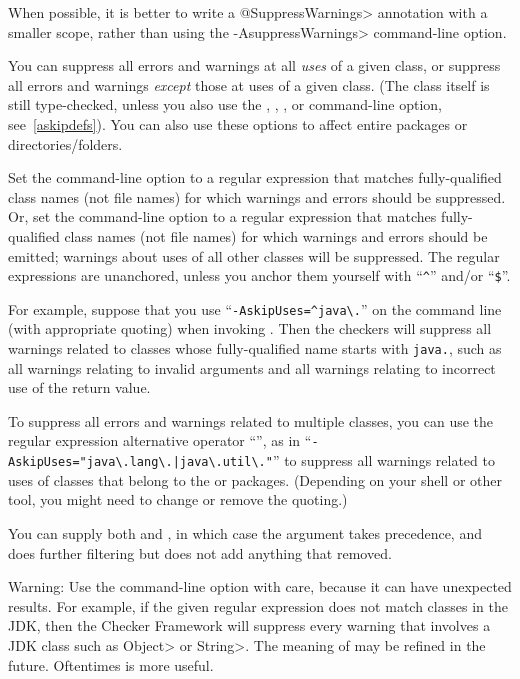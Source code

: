 When possible, it is better to write a \<@SuppressWarnings> annotation with a
smaller scope, rather than using the \<-AsuppressWarnings> command-line option.



You can suppress all errors and warnings at all \emph{uses} of a given
class, or suppress all errors and warnings \emph{except} those at uses of a given
class.  (The class itself is still type-checked, unless you also use
the , , , or 
command-line option, see~\ref{askipdefs}).
You can also use these options to affect entire packages or directories/folders.

Set the  command-line option to a
regular expression that matches fully-qualified class names (not file names) for which warnings and errors
should be suppressed.
Or, set the  command-line option to a
regular expression that matches fully-qualified class names (not file names) for which warnings and errors
should be emitted; warnings about uses of all other classes will be suppressed.
The regular expressions are unanchored, unless you anchor them yourself
with ``\codesize\verb|^|'' and/or ``\codesize\verb|$|''.

For example, suppose that you use
``{\codesize\verb|-AskipUses=^java\.|}'' on the command line
(with appropriate quoting) when invoking
.  Then the checkers will suppress all warnings related to
classes whose fully-qualified name starts with \codesize\verb|java.|, such
as all warnings relating to invalid arguments and all warnings relating to
incorrect use of the return value.

To suppress all errors and warnings related to multiple classes, you can use
the regular expression alternative operator ``\code{|}'', as in
``{\codesize\verb+-AskipUses="java\.lang\.|java\.util\."+}'' to suppress
all warnings related to uses of classes that belong to the  or
 packages.  (Depending on your shell or other tool, you
might need to change or remove the quoting.)

You can supply both  and , in which case
the  argument takes precedence, and  does
further filtering but does not add anything that  removed.

Warning:  Use the  command-line option with care,
because it can have unexpected results.  For example, if the
given regular expression does not match classes in the JDK, then the
Checker Framework will suppress every warning that involves a JDK class
such as \<Object> or \<String>.  The meaning of  may be
refined in the future.  Oftentimes  is more useful.

